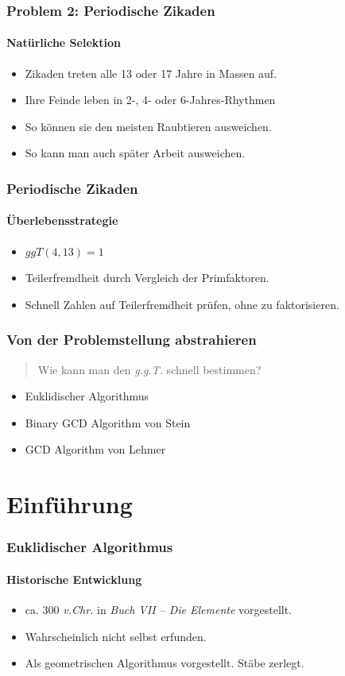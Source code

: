 \documentclass[•]{beamer}
\begin{document}
\begin{frame}
	\frametitle{Problem 2: Periodische Zikaden}
    \framesubtitle{Nat\"urliche Selektion}
    \begin{itemize}
    \item Zikaden treten alle 13 oder 17 Jahre in Massen auf.
    \item Ihre Feinde leben in 2-, 4- oder 6-Jahres-Rhythmen
    \item So k\"onnen sie den meisten Raubtieren ausweichen.
    \item So kann man auch sp\"ater Arbeit ausweichen.
    \end{itemize}
\end{frame}

\begin{frame}
	\frametitle{Periodische Zikaden}
	\framesubtitle{\"Uberlebensstrategie}
\begin{itemize}
\item $\textit{ggT}(4,13) = 1$
\item Teilerfremdheit durch Vergleich der Primfaktoren.
\item Schnell Zahlen auf Teilerfremdheit pr\"ufen, ohne zu faktorisieren.
\end{itemize}
\end{frame}

\begin{frame}
\frametitle{Von der Problemstellung abstrahieren}
\begin{quote}
		Wie kann man den \textit{g.g.T.} schnell bestimmen?
	\end{quote}
	\begin{itemize}
	\item Euklidischer Algorithmus
	\item Binary GCD Algorithm von Stein
	\item GCD Algorithm von Lehmer
	\end{itemize}
\end{frame}

\section{Einf\"uhrung}

\begin{frame}       
	\frametitle{Euklidischer Algorithmus}
    \framesubtitle{Historische Entwicklung}
    \begin{itemize}
    \item  ca. 300 \textit{v.Chr.} in \textit{Buch VII -- Die Elemente} vorgestellt.
    \item Wahrscheinlich nicht selbst erfunden.
    \item Als geometrischen Algorithmus vorgestellt. St\"abe zerlegt.
    \end{itemize}
\end{frame}
\end{document}
